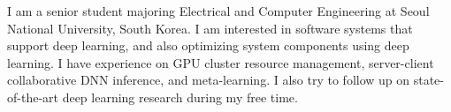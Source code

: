 

\begin{cvparagraph}

I am a senior student majoring Electrical and Computer Engineering at Seoul National University, South Korea. 
I am interested in software systems that support deep learning, and also optimizing system components using deep learning. 
I have experience on GPU cluster resource management, server-client collaborative DNN inference, and meta-learning.
I also try to follow up on state-of-the-art deep learning research during my free time. 
\end{cvparagraph}
